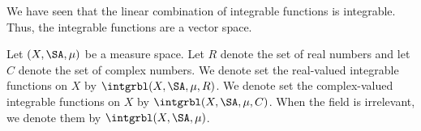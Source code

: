 
\sbasic



\sstart



We have seen that
the linear combination
of integrable functions
is integrable.
Thus, the integrable
functions are a vector
space.



Let $(X, \SA, \mu)$
be a measure space.
Let $R$ denote
the set of real numbers
and let $C$ denote
the set of complex numbers.
We denote set the
real-valued integrable
functions on $X$
by $\intgrbl(X, \SA, \mu, R)$.
We denote set the
complex-valued integrable
functions on $X$
by $\intgrbl(X, \SA, \mu, C)$.
When the field is irrelevant,
we denote them by $\intgrbl(X, \SA, \mu)$.

\strats
